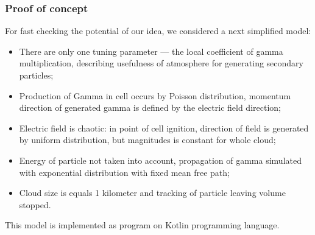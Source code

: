 \documentclass[8pt,pdf,hyperref={unicode}]{beamer}
\begin{document}
\begin{frame}
    \frametitle{Proof of concept}
{\large    	For fast checking the potential of our idea, we considered a next simplified model:  }
{\large     \begin{itemize}
    	\item There are only one tuning parameter  --- the local coefficient of gamma multiplication, describing usefulness of atmosphere for generating secondary particles;
    	\item Production of Gamma in cell occurs by Poisson distribution, momentum direction of generated gamma is defined by the electric field direction;
    	\item Electric field is chaotic: in point of cell ignition, direction of field is generated by uniform distribution, but magnitudes is constant for whole cloud;
    	\item Energy of particle not taken into account, propagation of gamma simulated with exponential distribution with fixed mean free path;
    	\item Cloud size is equals 1 kilometer and tracking of particle leaving volume stopped. 
    \end{itemize}}
{\large     This model is implemented as program on Kotlin programming language.}
    
    
\end{frame}
\end{document}
